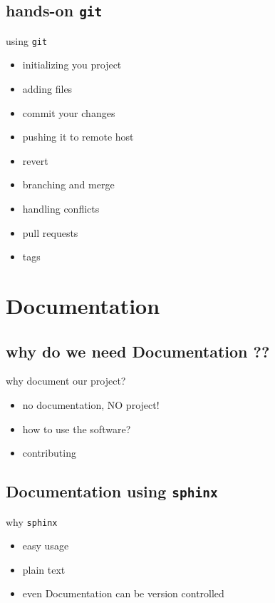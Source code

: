 \documentclass{beamer}
\begin{document}
\subsection{hands-on {\tt git}}
\begin{frame}{using {\tt git}}
    \begin{itemize}
    \item initializing you project
    \item adding files 
    \item commit your changes
    \item pushing it to remote host
    \item revert
    \item branching and merge
    \item handling conflicts
    \item pull requests
    \item tags
    \end{itemize}
\end{frame}

\section{Documentation}
\subsection{why do we need Documentation ??}
\begin{frame}{why document our project?}
    \begin{itemize}
    \item no documentation, NO project!
    \item how to use the software?
    \item contributing 
    \end{itemize}
\end{frame}

\subsection{Documentation using {\tt sphinx}}
\begin{frame}{why {\tt sphinx}}
    \begin{itemize}
    \item easy usage
    \item plain text
    \item even Documentation can be version controlled
    \end{itemize}
\end{frame}
\end{document}
